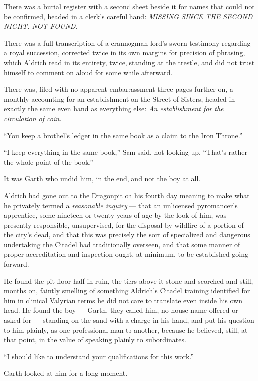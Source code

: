 There was a burial register with a second sheet beside it for names that could not be confirmed, headed in a clerk’s careful hand: \textit{MISSING SINCE THE SECOND NIGHT. NOT FOUND.}

There was a full transcription of a crannogman lord’s sworn testimony regarding a royal succession, corrected twice in its own margins for precision of phrasing, which Aldrich read in its entirety, twice, standing at the trestle, and did not trust himself to comment on aloud for some while afterward.

There was, filed with no apparent embarrassment three pages further on, a monthly accounting for an establishment on the Street of Sisters, headed in exactly the same even hand as everything else: \textit{An establishment for the circulation of coin.}

“You keep a brothel’s ledger in the same book as a claim to the Iron Throne.”

“I keep everything in the same book,” Sam said, not looking up. “That’s rather the whole point of the book.”

\sceneBreak

It was Garth who undid him, in the end, and not the boy at all.

Aldrich had gone out to the Dragonpit on his fourth day meaning to make what he privately termed a \textit{reasonable inquiry} — that an unlicensed pyromancer’s apprentice, some nineteen or twenty years of age by the look of him, was presently responsible, unsupervised, for the disposal by wildfire of a portion of the city’s dead, and that this was precisely the sort of specialized and dangerous undertaking the Citadel had traditionally overseen, and that some manner of proper accreditation and inspection ought, at minimum, to be established going forward.

He found the pit floor half in ruin, the tiers above it stone and scorched and still, months on, faintly smelling of something Aldrich’s Citadel training identified for him in clinical Valyrian terms he did not care to translate even inside his own head. He found the boy — Garth, they called him, no house name offered or asked for — standing on the sand with a charge in his hand, and put his question to him plainly, as one professional man to another, because he believed, still, at that point, in the value of speaking plainly to subordinates.

“I should like to understand your qualifications for this work.”

Garth looked at him for a long moment.

